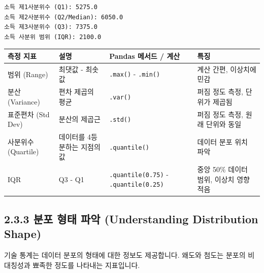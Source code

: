\documentclass[
  letterpaper,
]{book}
\begin{document}
\begin{verbatim}
소득 제1사분위수 (Q1): 5275.0
소득 제2사분위수 (Q2/Median): 6050.0
소득 제3사분위수 (Q3): 7375.0
소득 사분위 범위 (IQR): 2100.0
\end{verbatim}

\begin{longtable}[]{@{}
  >{\raggedright\arraybackslash}p{}
  >{\raggedright\arraybackslash}p{}
  >{\raggedright\arraybackslash}p{}
  >{\raggedright\arraybackslash}p{}@{}}
\toprule\noalign{}
\begin{minipage}[b]{\linewidth}\raggedright
측정 지표
\end{minipage} & \begin{minipage}[b]{\linewidth}\raggedright
설명
\end{minipage} & \begin{minipage}[b]{\linewidth}\raggedright
Pandas 메서드 / 계산
\end{minipage} & \begin{minipage}[b]{\linewidth}\raggedright
특징
\end{minipage} \\
\midrule\noalign{}
\endhead
\bottomrule\noalign{}
\endlastfoot
범위 (Range) & 최댓값 - 최솟값 & \texttt{.max()} - \texttt{.min()} &
계산 간편, 이상치에 민감 \\
분산 (Variance) & 편차 제곱의 평균 & \texttt{.var()} & 퍼짐 정도 측정,
단위가 제곱됨 \\
표준편차 (Std Dev) & 분산의 제곱근 & \texttt{.std()} & 퍼짐 정도 측정,
원래 단위와 동일 \\
사분위수 (Quartile) & 데이터를 4등분하는 지점의 값 &
\texttt{.quantile()} & 데이터 분포 위치 파악 \\
IQR & Q3 - Q1 & \texttt{.quantile(0.75)} - \texttt{.quantile(0.25)} &
중앙 50\% 데이터 범위, 이상치 영향 적음 \\
\end{longtable}

\subsection{2.3.3 분포 형태 파악 (Understanding Distribution
Shape)}\label{uxbd84uxd3ec-uxd615uxd0dc-uxd30cuxc545-understanding-distribution-shape}

기술 통계는 데이터 분포의 형태에 대한 정보도 제공합니다. 왜도와 첨도는
분포의 비대칭성과 뾰족한 정도를 나타내는 지표입니다.
\end{document}
